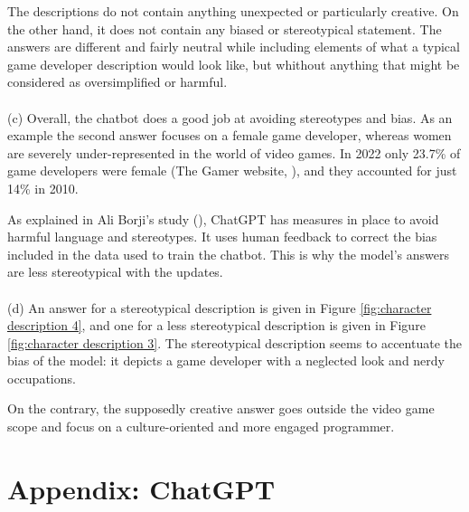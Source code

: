 \documentclass[a4paper]{article}
\begin{document}
The descriptions do not contain anything unexpected or particularly creative. On the other hand, it does not contain any biased or stereotypical statement.
The answers are different and fairly neutral while including elements of what a typical game developer description would look like, but whithout anything that might be considered as oversimplified or harmful.\\
\\
(c) Overall, the chatbot does a good job at avoiding stereotypes and bias.
As an example the second answer focuses on a female game developer, whereas women are severely under-represented in the world of video games.
In 2022 only 23.7\% of game developers were female (The Gamer website, \cite{TheGamer:2022}), and they accounted for just 14\% in 2010.

As explained in Ali Borji's study (\cite{Borji:2023}), ChatGPT has measures in place to avoid harmful language and stereotypes.
It uses human feedback to correct the bias included in the data used to train the chatbot. This is why the model's answers are less stereotypical with the updates.
\\
\\
(d) An answer for a stereotypical description is given in Figure \ref{fig:character description 4}, and one for a less stereotypical description is given in Figure \ref{fig:character description 3}.
The stereotypical description seems to accentuate the bias of the model: it depicts a game developer with a neglected look and nerdy occupations.

On the contrary, the supposedly creative answer goes outside the video game scope and focus on a culture-oriented and more engaged programmer.

\section*{Appendix: ChatGPT}
\end{document}
